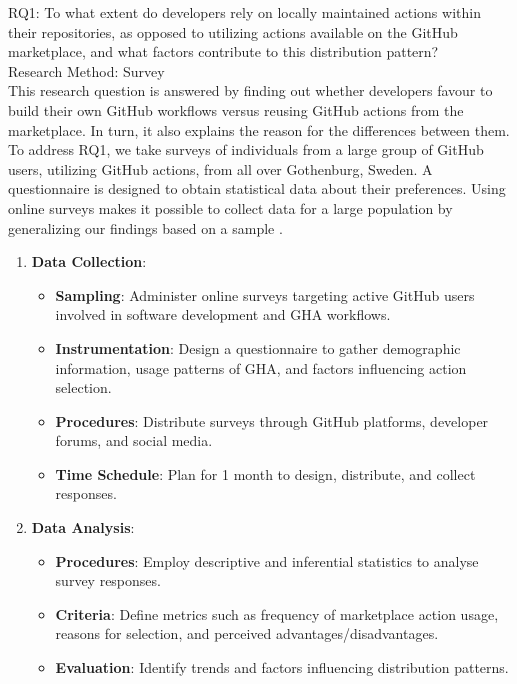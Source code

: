 \documentclass[conference]{IEEEtran}
\begin{document}
RQ1: To what extent do developers rely on locally maintained actions within their repositories, as opposed to utilizing actions available on the GitHub marketplace, and what factors contribute to this distribution pattern?\\

Research Method: Survey\\
	
This research question is answered by finding out whether developers favour to build their own GitHub workflows versus reusing GitHub actions from the marketplace. In turn, it also explains the reason for the differences between them.\\

To address RQ1, we take surveys of individuals from a large group of GitHub users, utilizing GitHub actions, from all over Gothenburg, Sweden. A questionnaire is designed to obtain statistical data about their preferences. Using online surveys makes it possible to collect data for a large population by generalizing our findings based on a sample \cite{b19}.\\

\begin{enumerate}
    \item \textbf{Data Collection}:\\
    \begin{itemize}
        \item \textbf{Sampling}: Administer online surveys targeting active GitHub users involved in software development and GHA workflows.
        \item \textbf{Instrumentation}: Design a questionnaire to gather demographic information, usage patterns of GHA, and factors influencing action selection.
        \item \textbf{Procedures}: Distribute surveys through GitHub platforms, developer forums, and social media.
        \item \textbf{Time Schedule}: Plan for 1 month to design, distribute, and collect responses.\\
    \end{itemize}
    
    \item \textbf{Data Analysis}:\\
    \begin{itemize}
        \item \textbf{Procedures}: Employ descriptive and inferential statistics to analyse survey responses.
        \item \textbf{Criteria}: Define metrics such as frequency of marketplace action usage, reasons for selection, and perceived advantages/disadvantages.
        \item \textbf{Evaluation}: Identify trends and factors influencing distribution patterns.\\
    \end{itemize}
\end{enumerate}
\end{document}
